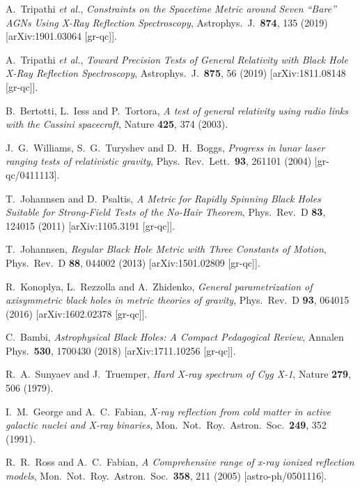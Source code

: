 \documentclass[11pt,a4paper,pdftex]{article}
\begin{document}
\begin{thebibliography}{99}
  A.~Tripathi {\it et al.},
  {\it Constraints on the Spacetime Metric around Seven “Bare” AGNs Using X-Ray Reflection Spectroscopy},
  Astrophys.\ J.\  {\bf 874}, 135 (2019)
  [arXiv:1901.03064 [gr-qc]].
  
  A.~Tripathi {\it et al.},
  {\it Toward Precision Tests of General Relativity with Black Hole X-Ray Reflection Spectroscopy},
  Astrophys.\ J.\  {\bf 875}, 56 (2019)
  [arXiv:1811.08148 [gr-qc]].  
  
  B.~Bertotti, L.~Iess and P.~Tortora,
  {\it A test of general relativity using radio links with the Cassini spacecraft},
  Nature {\bf 425}, 374 (2003).

  J.~G.~Williams, S.~G.~Turyshev and D.~H.~Boggs,
  {\it Progress in lunar laser ranging tests of relativistic gravity},
  Phys.\ Rev.\ Lett.\  {\bf 93}, 261101 (2004)
  [gr-qc/0411113].  
  
  T.~Johannsen and D.~Psaltis,
  {\it A Metric for Rapidly Spinning Black Holes Suitable for Strong-Field Tests of the No-Hair Theorem},
  Phys.\ Rev.\ D {\bf 83}, 124015 (2011)
  [arXiv:1105.3191 [gr-qc]].

  T.~Johannsen,
  {\it Regular Black Hole Metric with Three Constants of Motion},
  Phys.\ Rev.\ D {\bf 88}, 044002 (2013)
  [arXiv:1501.02809 [gr-qc]].

  R.~Konoplya, L.~Rezzolla and A.~Zhidenko,
  {\it General parametrization of axisymmetric black holes in metric theories of gravity},
  Phys.\ Rev.\ D {\bf 93}, 064015 (2016)
  [arXiv:1602.02378 [gr-qc]].  
  
  C.~Bambi,
  {\it Astrophysical Black Holes: A Compact Pedagogical Review},
  Annalen Phys.\  {\bf 530}, 1700430 (2018)
  [arXiv:1711.10256 [gr-qc]].   
  
  R.~A.~Sunyaev and J.~Truemper,
  {\it Hard X-ray spectrum of Cyg X-1},
  Nature {\bf 279}, 506 (1979).

  I.~M.~George and A.~C.~Fabian,
  {\it X-ray reflection from cold matter in active galactic nuclei and X-ray binaries},
  Mon.\ Not.\ Roy.\ Astron.\ Soc.\  {\bf 249}, 352 (1991).

  R.~R.~Ross and A.~C.~Fabian,
  {\it A Comprehensive range of x-ray ionized reflection models},
  Mon.\ Not.\ Roy.\ Astron.\ Soc.\  {\bf 358}, 211 (2005)
  [astro-ph/0501116].


\end{thebibliography}
\end{document}
